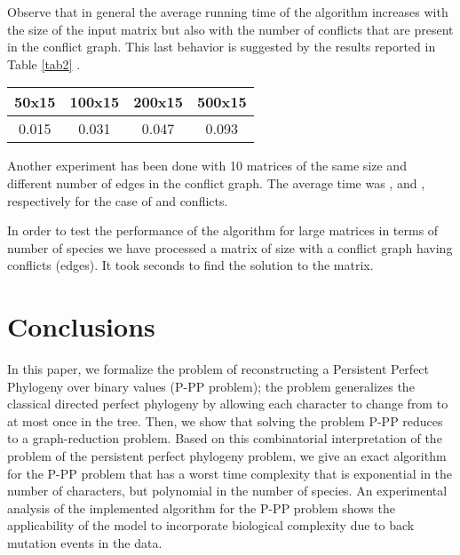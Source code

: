 \documentclass{llncs}
\begin{document}
Observe that in general the average running time of the algorithm increases with the size of the input matrix but also with the number of conflicts   that are present in the conflict graph.
This last behavior is suggested  by the results reported in Table \ref{tab2} .


\begin{table*}
\caption{Average execution time in seconds to solve   matrices with a single conflict. }
\label{tab2}
\centering
\begin{scriptsize}
\begin{tabular}{|c|c|c|c|}
\hline
 {\bf 50x15} & {\bf 100x15} & {\bf 200x15} & {\bf 500x15} \\
\hline
0.015&	0.031&	0.047&	0.093 \\
\hline
\end{tabular}
\end{scriptsize}


\end{table*} 

Another experiment has been done with 10 matrices of the same size  and different number of edges in the conflict graph. The average time was  ,      and  , respectively for the case of  and  conflicts. 

In order to test the performance of the algorithm for large matrices in terms of number of species we have processed a matrix of size  with a conflict graph having  conflicts (edges).  It took  seconds to find the solution to the matrix.


\section{Conclusions}

In this paper, we formalize the problem of reconstructing a Persistent Perfect Phylogeny over binary values (P-PP problem); the problem generalizes  the classical directed perfect phylogeny by allowing each character to change from  to  at most once in the tree.
Then, we show that  solving the problem P-PP reduces to a graph-reduction problem.   Based on this combinatorial interpretation of the problem of the persistent perfect phylogeny  problem, we give an exact algorithm for the P-PP problem that has a worst time complexity that is exponential in the number of characters,  but polynomial in the number of species. 
An experimental analysis of the implemented algorithm for the P-PP problem  shows the applicability of the model  to incorporate biological complexity due to  back mutation events in the data.
\end{document}
